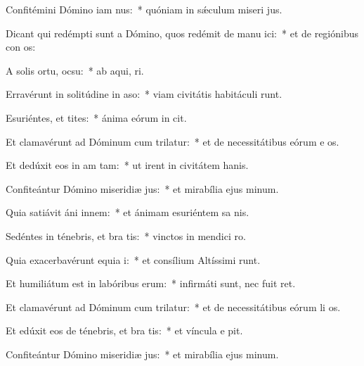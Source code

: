 \item Confitémini Dómino iam nus:~* quóniam in sǽculum miseri jus.
\item Dicant qui redémpti sunt a Dómino, quos redémit de manu ici:~* et de regiónibus con os:
\item A solis ortu,  ocsu:~* ab aqui,  ri.
\item Erravérunt in solitúdine in aso:~* viam civitátis habitáculi  runt.
\item Esuriéntes, et tites:~* ánima eórum in  cit.
\item Et clamavérunt ad Dóminum cum trilatur:~* et de necessitátibus eórum e os.
\item Et dedúxit eos in am tam:~* ut irent in civitátem hanis.
\item Confiteántur Dómino miseridiæ jus:~* et mirabília ejus  minum.
\item Quia satiávit áni innem:~* et ánimam esuriéntem sa nis.
\item Sedéntes in ténebris, et bra tis:~* vinctos in mendici  ro.
\item Quia exacerbavérunt equia i:~* et consílium Altíssimi runt.
\item Et humiliátum est in labóribus  erum:~* infirmáti sunt, nec fuit  ret.
\item Et clamavérunt ad Dóminum cum trilatur:~* et de necessitátibus eórum li os.
\item Et edúxit eos de ténebris, et bra tis:~* et víncula e pit.
\item Confiteántur Dómino miseridiæ jus:~* et mirabília ejus  minum.
